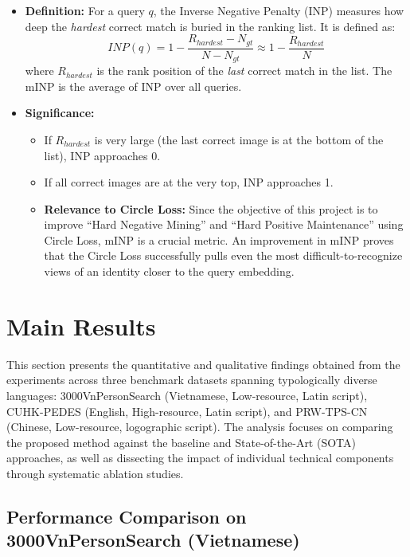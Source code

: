 \documentclass[../main.tex]{subfiles}
\begin{document}
\begin{itemize}
    \item \textbf{Definition:} For a query $q$, the Inverse Negative Penalty (INP) measures how deep the \textit{hardest} correct match is buried in the ranking list. It is defined as:
    \[
    INP(q) = 1 - \frac{R_{hardest} - N_{gt}}{N - N_{gt}} \approx 1 - \frac{R_{hardest}}{N}
    \]
    where $R_{hardest}$ is the rank position of the \textit{last} correct match in the list. The mINP is the average of INP over all queries.

    \item \textbf{Significance:}
    \begin{itemize}
        \item If $R_{hardest}$ is very large (the last correct image is at the bottom of the list), INP approaches 0.
        \item If all correct images are at the very top, INP approaches 1.
        \item \textbf{Relevance to Circle Loss:} Since the objective of this project is to improve ``Hard Negative Mining'' and ``Hard Positive Maintenance'' using Circle Loss, mINP is a crucial metric. An improvement in mINP proves that the Circle Loss successfully pulls even the most difficult-to-recognize views of an identity closer to the query embedding.
    \end{itemize}
\end{itemize}

\section{Main Results}

This section presents the quantitative and qualitative findings obtained from the experiments across three benchmark datasets spanning typologically diverse languages: 3000VnPersonSearch (Vietnamese, Low-resource, Latin script), CUHK-PEDES (English, High-resource, Latin script), and PRW-TPS-CN (Chinese, Low-resource, logographic script). The analysis focuses on comparing the proposed method against the baseline and State-of-the-Art (SOTA) approaches, as well as dissecting the impact of individual technical components through systematic ablation studies.

\subsection{Performance Comparison on 3000VnPersonSearch (Vietnamese)}
\end{document}
